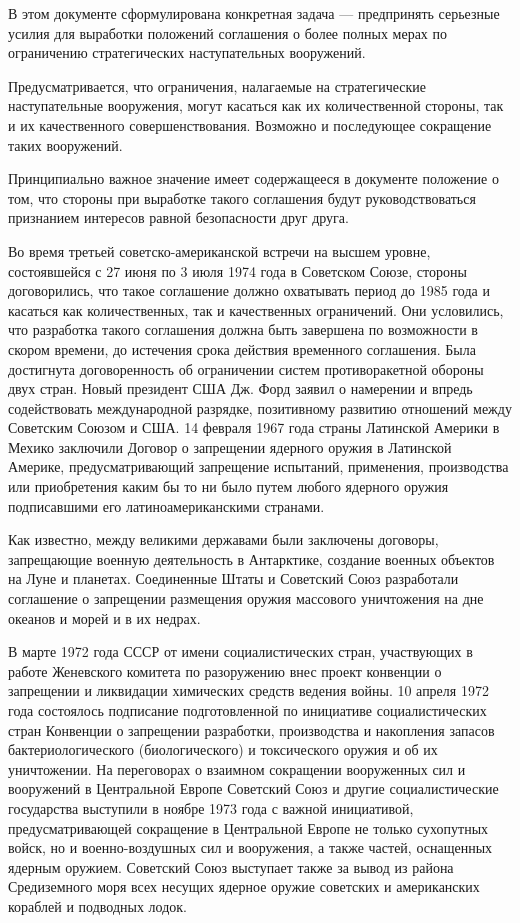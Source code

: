 \documentclass[12pt, a4paper, openany]{book}
\begin{document}
	
	
	В этом документе сформулирована конкретная задача — предпринять серьезные усилия для выработки положений соглашения о более полных мерах по ограничению стратегических наступательных вооружений.
	
	Предусматривается, что ограничения, налагаемые на стратегические наступательные вооружения, могут касаться как их количественной стороны, так и их качественного совершенствования. Возможно и последующее сокращение таких вооружений.
	
	Принципиально важное значение имеет содержащееся в документе положение о том, что стороны при выработке такого соглашения будут руководствоваться признанием интересов равной безопасности друг друга.
	
	Во время третьей советско-американской встречи на высшем уровне, состоявшейся с 27 июня по 3 июля 1974 года в Советском Союзе, стороны договорились, что такое соглашение должно охватывать период до 1985 года и касаться как количественных, так и качественных ограничений. Они условились, что разработка такого соглашения должна быть завершена по возможности в скором времени, до истечения срока действия временного соглашения. Была достигнута договоренность об ограничении систем противоракетной обороны двух стран. Новый президент США Дж. Форд заявил о намерении и впредь содействовать международной разрядке, позитивному развитию отношений между Советским Союзом и США. 14 февраля 1967 года страны Латинской Америки в Мехико заключили Договор о запрещении ядерного оружия в Латинской Америке, предусматривающий запрещение испытаний, применения, производства или приобретения каким бы то ни было путем любого ядерного оружия подписавшими его латиноамериканскими странами.
	
	Как известно, между великими державами были заключены договоры, запрещающие военную деятельность в Антарктике, создание военных объектов на Луне и планетах. Соединенные Штаты и Советский Союз разработали соглашение о запрещении размещения оружия массового уничтожения на дне океанов и морей и в их недрах.
	
	В марте 1972 года СССР от имени социалистических стран, участвующих в работе Женевского комитета по разоружению внес проект конвенции о запрещении и ликвидации химических средств ведения войны. 10 апреля 1972 года состоялось подписание подготовленной по инициативе социалистических стран Конвенции о запрещении разработки, производства и накопления запасов бактериологического (биологического) и токсического оружия и об их уничтожении. На переговорах о взаимном сокращении вооруженных сил и вооружений в Центральной Европе Советский Союз и другие социалистические государства выступили в ноябре 1973 года с важной инициативой, предусматривающей сокращение в Центральной Европе не только сухопутных войск, но и военно-воздушных сил и вооружения, а также частей, оснащенных ядерным оружием. Советский Союз выступает также за вывод из района Средиземного моря всех несущих ядерное оружие советских и американских кораблей и подводных лодок.
	
\end{document}
